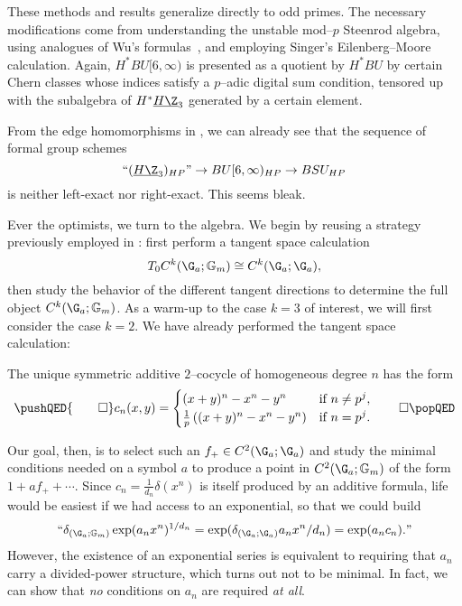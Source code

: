 \begin{remark}
These methods and results generalize directly to odd primes.  The necessary modifications come from understanding the unstable mod--$p$ Steenrod algebra, using analogues of Wu's formulas~\cite{Shay}, and employing Singer's Eilenberg--Moore calculation.  Again, $H^* BU[6, \infty)$ is presented as a quotient by $H^* BU$ by certain Chern classes whose indices satisfy a $p$--adic digital sum condition, tensored up with the subalgebra of $H^* \OS{H\Z}{3}$ generated by a certain element.
\end{remark}

From the edge homomorphisms in , we can already see that the sequence of formal group schemes \[\text{``$(\OS{H\Z}{3})_{HP}$''} \to BU[6, \infty)_{HP} \to BSU_{HP}\] is neither left-exact nor right-exact.  This seems bleak.

Ever the optimists, we turn to the algebra.  We begin by reusing a strategy previously employed in : first perform a tangent space calculation \[T_0 C^k(\G_a; \Gm) \cong C^k(\G_a; \G_a),\] then study the behavior of the different tangent directions to determine the full object $C^k(\G_a; \Gm)$.  As a warm-up to the case $k = 3$ of interest, we will first consider the case $k = 2$.  We have already performed the tangent space calculation:

\begin{corollary}
The unique symmetric additive $2$--cocycle of homogeneous degree $n$ has the form
\[\pushQED{\qed}
c_n(x, y) = \begin{cases} (x + y)^n - x^n - y^n & \text{if $n \ne p^j$}, \\ \frac{1}{p} \left( (x + y)^n - x^n - y^n \right) & \text{if $n = p^j$}. \end{cases} \qedhere
\popQED\]
\end{corollary}

Our goal, then, is to select such an $f_+ \in C^2(\G_a; \G_a)$ and study the minimal conditions needed on a symbol $a$ to produce a point in $C^2(\G_a; \Gm)$ of the form $1 + af_+ + \cdots$.  Since $c_n = \frac{1}{d_n} \delta(x^n)$ is itself produced by an additive formula, life would be easiest if we had access to an exponential, so that we could build \[\text{``$ \delta_{(\G_a; \Gm)} \exp(a_n x^n)^{1/d_n} = \exp(\delta_{(\G_a; \G_a)} a_n x^n / d_n) = \exp(a_n c_n). $''}\]  However, the existence of an exponential series is equivalent to requiring that $a_n$ carry a divided-power structure, which turns out not to be minimal.  In fact, we can show that \emph{no} conditions on $a_n$ are required \emph{at all}.

